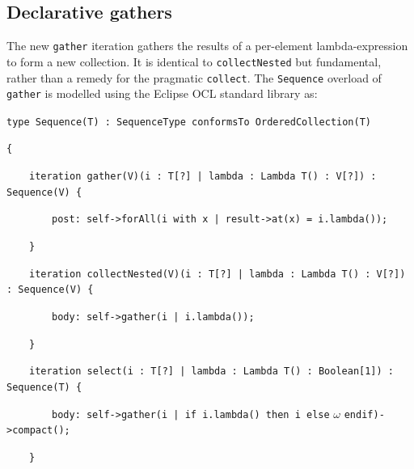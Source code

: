 \documentclass[
]{ceurart}
\begin{document}
\subsection{Declarative gathers}

The new \verb!gather! iteration gathers the results of a per-element lambda-expression to form a new collection. It is identical to \verb!collectNested! but fundamental,  rather than a remedy for the pragmatic \verb!collect!. The \verb!Sequence! overload of \verb!gather! is modelled using the Eclipse OCL standard library \cite{willink2011modeling} as:

\begin{description}[itemsep=-0.2cm]\vspace{-10pt}\small\begin{samepage}
\item \verb!type Sequence(T) : SequenceType conformsTo OrderedCollection(T)!
\item  \verb!{!
\item ~~~~\verb!iteration gather(V)(i : T[?] | lambda : Lambda T() : V[?]) : Sequence(V) {!
\item ~~~~~~~~\verb!post: self->forAll(i with x | result->at(x) = i.lambda());!
\item ~~~~\verb!}!
\end{samepage}\vspace{-10pt}\end{description}
\begin{description}[itemsep=-0.2cm]\vspace{-10pt}\small\begin{samepage}
\item ~~~~\verb!iteration collectNested(V)(i : T[?] | lambda : Lambda T() : V[?]) : Sequence(V) {!
\item ~~~~~~~~\verb!body: self->gather(i | i.lambda());!
\item ~~~~\verb!}!
\end{samepage}\vspace{-10pt}\end{description}
\begin{description}[itemsep=-0.2cm]\vspace{-10pt}\small\begin{samepage}

\item ~~~~\verb!iteration select(i : T[?] | lambda : Lambda T() : Boolean[1]) : Sequence(T) {!
\item ~~~~~~~~\verb!body: self->gather(i | if i.lambda() then i else! $\omega$ \verb!endif)->compact();!
\item ~~~~\verb!}!
\end{samepage}\vspace{-10pt}\end{description}
\end{document}
